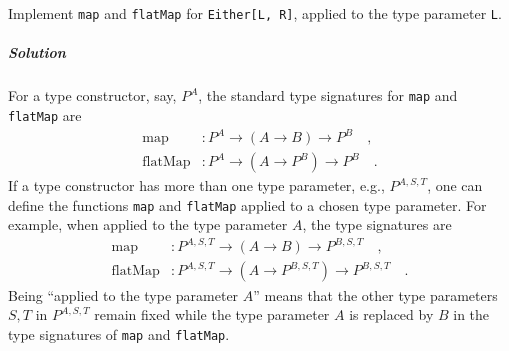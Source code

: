 Implement \lstinline!map! and \lstinline!flatMap! for \lstinline!Either[L, R]!,
applied to the type parameter \lstinline!L!.

\subparagraph{Solution}

For a type constructor, say, $P^{A}$, the standard type signatures
for \lstinline!map! and \lstinline!flatMap! are
\begin{align*}
\text{map} & :P^{A}\rightarrow(A\rightarrow B)\rightarrow P^{B}\quad,\\
\text{flatMap} & :P^{A}\rightarrow(A\rightarrow P^{B})\rightarrow P^{B}\quad.
\end{align*}
If a type constructor has more than one type parameter, e.g., $P^{A,S,T}$,
one can define the functions \lstinline!map! and \lstinline!flatMap!
applied to a chosen type parameter. For example, when applied to the
type parameter $A$, the type signatures are 
\begin{align*}
\text{map} & :P^{A,S,T}\rightarrow(A\rightarrow B)\rightarrow P^{B,S,T}\quad,\\
\text{flatMap} & :P^{A,S,T}\rightarrow(A\rightarrow P^{B,S,T})\rightarrow P^{B,S,T}\quad.
\end{align*}
Being \textsf{``}applied to the type parameter $A$\textsf{''} means that the other
type parameters $S,T$ in $P^{A,S,T}$ remain fixed while the type
parameter $A$ is replaced by $B$ in the type signatures of \lstinline!map!
and \lstinline!flatMap!.

